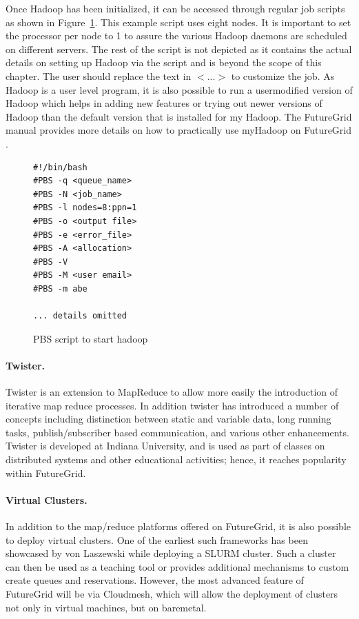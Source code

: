\documentclass[graybox]{svmult}
\begin{document}
Once Hadoop has been initialized, it can be accessed through regular job scripts as shown in Figure~\ref{F:myhadoop-script}. This example script uses eight nodes. It is important to set the processor per node to 1 to assure the various Hadoop daemons are scheduled on different servers. The rest of the script is not depicted as it contains the actual details on setting up Hadoop via the script and is beyond the scope of this chapter. The user should replace the text in $<...>$ to customize the job. As Hadoop is a user level program, it is also possible to run a usermodified version of Hadoop which helps in adding new features or trying out newer versions of Hadoop than the default version that is installed for my Hadoop. The FutureGrid manual provides more details on how to practically use myHadoop on FutureGrid \cite{fg-manual-hadoop}.

\begin{figure}[htb]
\begin{center}
\begin{verbatim}
#!/bin/bash
#PBS -q <queue_name>
#PBS -N <job_name>
#PBS -l nodes=8:ppn=1
#PBS -o <output file>
#PBS -e <error_file>
#PBS -A <allocation>
#PBS -V
#PBS -M <user email>
#PBS -m abe

... details omitted
\end{verbatim}
\end{center}
\caption{PBS script to start hadoop}\label{F:myhadoop-script}
\end{figure}

\paragraph{Twister.}  Twister \cite{twsiter} is an extension to MapReduce to allow more easily the introduction of iterative map reduce processes. In addition twister has introduced a number of concepts including distinction between static and variable data, long running tasks, publish/subscriber based communication, and various other enhancements.  Twister is developed at Indiana University, and is used as part of classes on distributed systems and other educational activities; hence, it reaches popularity within FutureGrid.

\paragraph{Virtual Clusters.}  In addition to the map/reduce platforms offered on FutureGrid, it is also possible to deploy virtual clusters. One of the earliest such frameworks has been showcased by von Laszewski \cite{github-futuregrid-vc} while deploying a SLURM cluster. Such a cluster can then be used as a teaching tool or provides additional mechanisms to custom create queues and reservations. However, the most advanced feature of FutureGrid will be via Cloudmesh, which will allow the deployment of clusters not only in virtual machines, but on baremetal.
\end{document}
